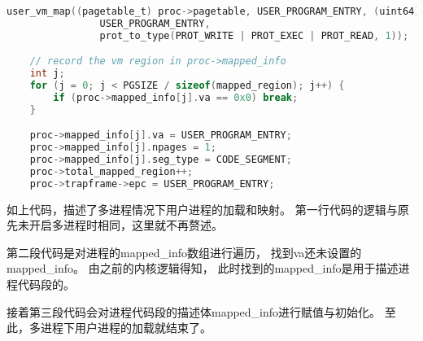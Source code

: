 \begin{lstlisting}[caption={多进程情况下用户进程的加载和映射}, label={lst:user_process_map_multi}, language=C]
    user_vm_map((pagetable_t) proc->pagetable, USER_PROGRAM_ENTRY, (uint64) _etext - USER_PROGRAM_ENTRY,
                USER_PROGRAM_ENTRY,
                prot_to_type(PROT_WRITE | PROT_EXEC | PROT_READ, 1));

    // record the vm region in proc->mapped_info
    int j;
    for (j = 0; j < PGSIZE / sizeof(mapped_region); j++) {
        if (proc->mapped_info[j].va == 0x0) break;
    }

    proc->mapped_info[j].va = USER_PROGRAM_ENTRY;
    proc->mapped_info[j].npages = 1;
    proc->mapped_info[j].seg_type = CODE_SEGMENT;
    proc->total_mapped_region++;
    proc->trapframe->epc = USER_PROGRAM_ENTRY;    
\end{lstlisting}

如上代码，描述了多进程情况下用户进程的加载和映射。
第一行代码的逻辑与原先未开启多进程时相同，这里就不再赘述。

第二段代码是对进程的mapped\_info数组进行遍历，
找到va还未设置的mapped\_info。
由之前的内核逻辑得知，
此时找到的mapped\_info是用于描述进程代码段的。

接着第三段代码会对进程代码段的描述体mapped\_info进行赋值与初始化。
至此，多进程下用户进程的加载就结束了。


